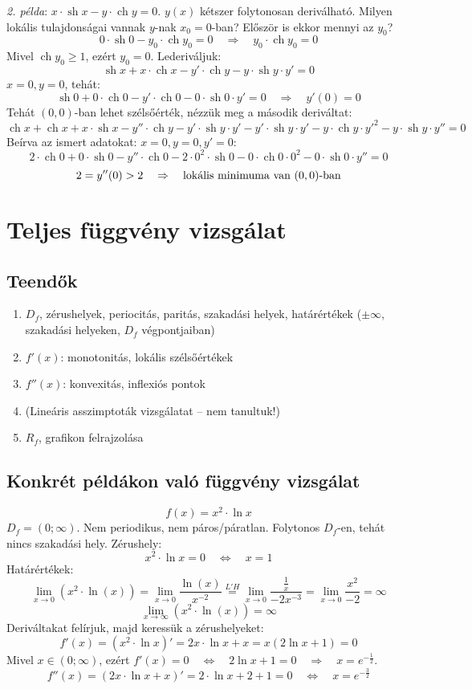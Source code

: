 \documentclass[a4paper,12pt,twoside]{book}
\DeclareMathOperator{\sh}{sh} %
\DeclareMathOperator{\ch}{ch} %
\theoremstyle{break}
\theoremstyle{plain}
\begin{document}
\emph{2. példa}: $x\cdot \sh x - y\cdot \ch y = 0$. $y(x)$ kétszer folytonosan deriválható. Milyen lokális tulajdonságai vannak $y$-nak $x_0=0$-ban? Először is ekkor mennyi az $y_0$?
\[0\cdot \sh 0 - y_0\cdot \ch y_0 = 0 \quad \Rightarrow \quad y_0\cdot \ch y_0 = 0\]
Mivel $\ch y_0 \geqslant 1$, ezért $y_0 = 0$.
Lederiváljuk:
\[\sh x+x\cdot\ch x - y'\cdot \ch y - y\cdot \sh y\cdot y' = 0\]
$x = 0, y=0$, tehát:
\[\sh 0+0\cdot\ch 0 - y'\cdot \ch 0 - 0\cdot \sh 0\cdot y' = 0 \quad \Rightarrow \quad y'(0) = 0\]
Tehát $(0,0)$-ban lehet szélsőérték, nézzük meg a második deriváltat:
\[\ch x+\ch x+x\cdot\sh x - y''\cdot \ch y - y'\cdot \sh y\cdot y' - y'\cdot \sh y\cdot y' - y\cdot \ch y\cdot y'^2 - y\cdot \sh y\cdot y'' = 0\]
Beírva az ismert adatokat: $x = 0, y=0, y'=0$:
\[2\cdot\ch 0+0\cdot\sh 0 - y''\cdot \ch 0 - 2\cdot 0^2\cdot \sh 0 - 0\cdot \ch 0\cdot 0^2 - 0\cdot \sh 0\cdot y'' = 0\]
\[2=y''(0) > 2 \quad \Rightarrow \quad \hbox{lokális minimuma van $(0,0)$-ban}\]

\section{Teljes függvény vizsgálat}

\subsection{Teendők}
\begin{enumerate}
 \item $D_f$, zérushelyek, periocitás, paritás, szakadási helyek, határértékek ($\pm\infty$, szakadási helyeken, $D_f$ végpontjaiban)
 \item $f'(x)$: monotonitás, lokális szélsőértékek
 \item $f''(x)$: konvexitás, inflexiós pontok
 \item (Lineáris asszimptoták vizsgálatat -- nem tanultuk!)
 \item $R_f$, grafikon felrajzolása
\end{enumerate}

\subsection{Konkrét példákon való függvény vizsgálat}

\[\boxed{f(x)=x^2\cdot \ln x}\]
$D_f = (0;\infty)$. Nem periodikus, nem páros/páratlan. Folytonos $D_f$-en, tehát nincs szakadási hely. Zérushely:
\[x^2\cdot \ln x = 0 \quad \Leftrightarrow \quad x=1\]
Határértékek:
\[\lim_{x\to 0} \left(x^2\cdot \ln(x)\right) = \lim_{x\to 0} \frac{\ln(x)}{x^{-2}} \overset{L'H}{=} \lim_{x\to 0} \frac{\frac{1}{x}}{-2x^{-3}} = \lim_{x\to 0} \frac{x^2}{-2} = \infty\]
\[\lim_{x\to \infty} \left(x^2\cdot \ln(x)\right) = \infty\]
Deriváltakat felírjuk, majd keressük a zérushelyeket:
\[f'(x) = (x^2\cdot \ln x)' = 2x\cdot \ln x+x = x(2\ln x +1) = 0\]
Mivel $x\in(0;\infty)$, ezért $f'(x)=0 \quad\Leftrightarrow\quad 2\ln x +1 = 0 \quad\Rightarrow\quad x=e^{-\frac{1}{2}}$.
\[f''(x) = (2x\cdot \ln x+x)' = 2\cdot \ln x+2+1 = 0 \quad\Leftrightarrow\quad x=e^{-\frac{3}{2}}\]
\end{document}
